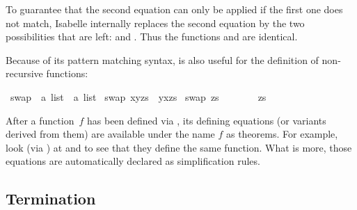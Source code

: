 \begin{isabellebody}
\begin{isamarkuptext}%
\noindent
To guarantee that the second equation can only be applied if the first
one does not match, Isabelle internally replaces the second equation
by the two possibilities that are left:  and
.  Thus the functions  and
 are identical.

Because of its pattern matching syntax,  is also useful
for the definition of non-recursive functions:%
\end{isamarkuptext}%
\isamarkuptrue%
\isamarkupfalse%
\ swap{}{}\ {}{}\ {}{}a\ list\ {}\ {}a\ list{}\ \isanewline
{}swap{}{}\ {}x{}y{}zs{}\ {}\ y{}x{}zs{}\ {}\isanewline
{}swap{}{}\ zs\ \ \ \ \ \ \ {}\ zs{}%
\begin{isamarkuptext}%
After a function~$f$ has been defined via ,
its defining equations (or variants derived from them) are available
under the name $f$ as theorems.
For example, look (via ) at
 and  to see that they define
the same function. What is more, those equations are automatically declared as
simplification rules.

\subsection{Termination}


\end{isamarkuptext}
\end{isabellebody}
